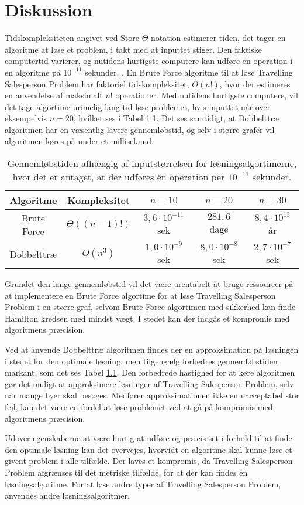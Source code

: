 \chapter{Diskussion}

Tidskompleksiteten angivet ved Store-$\Theta$ notation estimerer tiden, det tager en algoritme at løse et problem, i takt med at inputtet stiger. 
Den faktiske computertid varierer, og nutidens hurtigste computere kan udføre en operation i en algoritme på $10^{-11}$ sekunder. \cite{dmat}.
En Brute Force algoritme til at løse Travelling Salesperson Problem har faktoriel tidskompleksitet, $\Theta(n!)$, hvor der estimeres en anvendelse af maksimalt $n!$ operationer.
Med nutidens hurtigste computere, vil det tage algortime urimelig lang tid løse problemet, hvis inputtet når over eksempelvis $n=20$, hvilket ses i Tabel \ref{tab_algtsp}. Det ses samtidigt, at Dobbelttræ algoritmen har en væsentlig lavere gennemløbstid, og selv i større grafer vil algoritmen køres på under et millisekund. 

\begin{table}[h]
 \centering
  \begin{tabular}{|c|c|c|c|c|}
   \hline
   Algoritme & Kompleksitet & $n=10$ & $n=20$ & $n=30$\\
   \hline
		Brute Force & $\Theta((n-1)!)$ & $3,6 \cdot 10^{-11}$ sek & $281,6$ dage & $8,4 \cdot 10^{13}$ år \\
   \hline
   Dobbelttræ & $O(n^3)$ & $1,0 \cdot 10^{-9}$ sek & $8,0 \cdot 10^{-8}$ sek & $2,7 \cdot 10^{-7}$ sek \\
   \hline
  \end{tabular}
 \caption{Gennemløbstiden afhængig af inputstørrelsen for løsningsalgortimerne, hvor det er antaget, at der udføres én operation per $10^{-11}$ sekunder.} \label{tab_algtsp}
\end{table}

Grundet den lange gennemløbstid vil det være urentabelt at bruge ressourcer på at implementere en Brute Force algortime for at løse Travelling Salesperson Problem i en større graf, selvom Brute Force algortimen med sikkerhed kan finde Hamilton kredsen med mindst vægt. 
I stedet kan der indgås et kompromis med algoritmens præcision. 

Ved at anvende Dobbelttræ algoritmen findes der en approksimation på løsningen i stedet for den optimale løsning, men tilgengælg forbedres gennemløbstiden markant, som det ses Tabel \ref{tab_algtsp}. 
Den forbedrede hastighed for at køre algoritmen gør det muligt at approksimere løsninger af Travelling Salesperson Problem, selv når mange byer skal besøges. 
Medfører approksimationen ikke en uacceptabel stor fejl, kan det være en  fordel at løse problemet ved at gå på kompromis med algoritmens præcision.

Udover egenskaberne at være hurtig at udføre og præcis set i forhold til at finde den optimale løsning kan det overvejes, hvorvidt en algoritme skal kunne løse et givent problem i alle tilfælde. 
Der laves et kompromis, da Travelling Salesperson Problem afgrænses til det metriske tilfælde, for at der kan findes en løsningsalgoritme. For at løse andre typer af Travelling Salesperson Problem, anvendes andre løsningsalgoritmer. 
